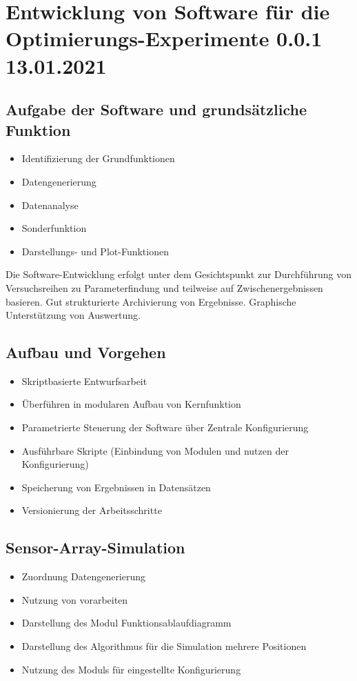 %

\chapter{Entwicklung von Software für die Optimierungs-Experimente 0.0.1 13.01.2021}

\section{Aufgabe der Software und grundsätzliche Funktion}
\begin{itemize}
	\item Identifizierung der Grundfunktionen
	\item Datengenerierung
	\item Datenanalyse
	\item Sonderfunktion
	\item Darstellungs- und Plot-Funktionen
\end{itemize}

Die Software-Entwicklung erfolgt unter dem Gesichtspunkt zur Durchführung von Versuchsreihen zu 
Parameterfindung und teilweise auf Zwischenergebnissen basieren.
Gut strukturierte Archivierung von Ergebnisse.
Graphische Unterstützung von Auswertung.
 
\section{Aufbau und Vorgehen}
	\begin{itemize}
		\item Skriptbasierte Entwurfsarbeit
		\item Überführen in modularen Aufbau von Kernfunktion
		\item Parametrierte Steuerung der Software über Zentrale Konfigurierung
		\item Ausführbare Skripte (Einbindung von Modulen und nutzen der Konfigurierung)
		\item Speicherung von Ergebnissen in Datensätzen
		\item Versionierung der Arbeitsschritte
	\end{itemize}


\section{Sensor-Array-Simulation}
	\begin{itemize}
		\item Zuordnung Datengenerierung
		\item Nutzung von vorarbeiten
		\item Darstellung des Modul Funktionsablaufdiagramm
		\item Darstellung des Algorithmus für die Simulation mehrere Positionen
		\item Nutzung des Moduls für eingestellte Konfigurierung
	\end{itemize}

